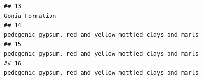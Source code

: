 \documentclass[]{article}
\begin{document}
\begin{verbatim}
## 13                                                                                                                                                                                                                                                                                                                                                                                                                                                                                                                                                                                                                                                                                  Gonia Formation
## 14                                                                                                                                                                                                                                                                                                                                                                                                                                                                                                                                                                                                                                         pedogenic gypsum, red and yellow-mottled clays and marls
## 15                                                                                                                                                                                                                                                                                                                                                                                                                                                                                                                                                                                                                                         pedogenic gypsum, red and yellow-mottled clays and marls
## 16                                                                                                                                                                                                                                                                                                                                                                                                                                                                                                                                                                                                                                         pedogenic gypsum, red and yellow-mottled clays and marls

\end{verbatim}
\end{document}
